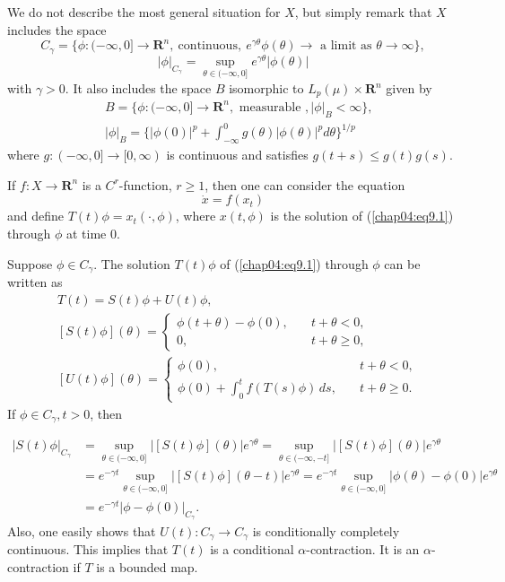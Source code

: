 \documentclass{surv-l}
\theoremstyle{plain}
\theoremstyle{definition}
\numberwithin{equation}{section}
\numberwithin{figure}{chapter}
\begin{document}
We do not describe the most general situation for $X$, but simply remark that $X$ includes the space
\begin{equation*}
C_{\gamma}=\{\phi\!:(-\infty, 0]\rightarrow \mathbf{R}^{n},\ \mathrm{continuous},\ e^{\gamma\theta}\phi(\theta)\rightarrow \text{ a limit as } \theta\rightarrow\infty\},
\end{equation*}
\begin{equation*}
|\phi|_{C_{\gamma}}=\sup_{\theta\in(-\infty,0]} e^{\gamma\theta}|\phi(\theta)|
\end{equation*}
with $\gamma>0$. It also includes the space $B$ isomorphic to $L_{p}(\mu)\times \mathbf{R}^{n}$ given by
\begin{align*}
&B=\{\phi\!:(-\infty, 0]\rightarrow \mathbf{R}^{n}, \text{ measurable }, |\phi|_{B}<\infty\},\\
\,&|\phi|_{B}=\{|\phi(0)|^{p}+\int_{-\infty}^{0}g(\theta)|\phi(\theta)|^{p}d\theta\}^{1/p}
\end{align*}
where $g\!:(-\infty, 0]\rightarrow[0, \infty)$ is continuous and satisfies $g(t+s)\leq g(t)g(s)$.

If $f\!:X\rightarrow \mathbf{R}^{n}$ is a $C^{r}$-function, $r\geq 1$, then one can consider the equation
\begin{equation}\label{chap04:eq9.1}
\dot{x}=f(x_{t})
\end{equation}
and define $T(t)\phi=x_{t}(\cdot, \phi)$, where $x(t, \phi)$ is the solution of (\ref{chap04:eq9.1}) through $\phi$ at time $0$.

Suppose $\phi \in C_{\gamma}$. The solution $ T(t)\phi$ of (\ref{chap04:eq9.1}) through $\phi$ can be written as
\begin{align*}
&T(t)=S(t)\phi+U(t)\phi,\\
&[S(t)\phi](\theta)=\left\{\begin{array}{ll}
\phi(t+\theta)-\phi(0), &\quad t+\theta<0,\\
0, & \quad t+\theta\geq 0,
\end{array}\right.\\
&[U(t)\phi](\theta)=\left\{\begin{array}{ll}
\phi(0), & t+\theta<0,\\
\phi(0)+\int_{0}^{t}f(T(s)\phi)\, ds,\quad & t+\theta\geq 0.
\end{array}\right.
\end{align*}
If $\phi \in C_{\gamma}, t>0$, then

\begin{align*}
|S(t)\phi|_{C_{\gamma}}&=\sup_{\theta\in(-\infty,0]}|[S(t)\phi](\theta)|e^{\gamma\theta}=\sup_{\theta\in(-\infty,-t]}|[S(t)\phi](\theta)|e^{\gamma\theta}\\
&=e^{-\gamma t}\sup_{\theta\in(-\infty,0]}|[S(t)\phi](\theta-t)|e^{\gamma\theta}=e^{-\gamma t}\sup_{\theta\in(-\infty,0]}|\phi(\theta)-\phi(0)|e^{\gamma\theta}\\
&=e^{-\gamma t}|\phi-\phi(0)|_{C_{\gamma}}.
\end{align*}
Also, one easily shows that $U(t)\!:C_{\gamma}\rightarrow C_{\gamma}$ is conditionally completely continuous. This implies that $T(t)$ is a conditional $\alpha$-contraction. It is an $\alpha$-contraction if $T$ is a bounded map.
\end{document}
